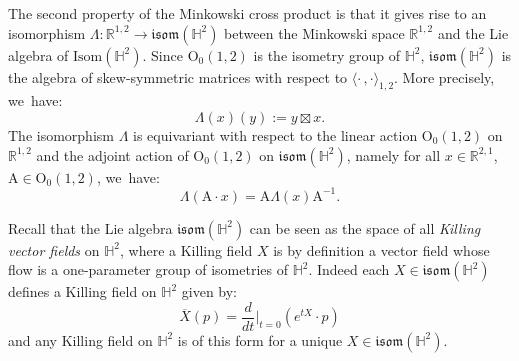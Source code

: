 \documentclass[10pt]{amsart}
\theoremstyle{plain}
\theoremstyle{definition}
\newcommand{\minko}{\mathbb{R}^{1,2}}
\newcommand{\inner}[1] {\langle #1 \rangle}
\begin{document}
The second property of the Minkowski cross product is that it gives rise to an isomorphism $\Lambda: \mathbb{R}^{1,2}\to \mathfrak{isom}(\mathbb{H}^2)$ between the Minkowski space $\minko$ and the Lie algebra of $\mathrm{Isom}(\mathbb{H}^2)$. Since $\mathrm{O}_0(1,2)$ is the isometry group of $\mathbb{H}^2$, $\mathfrak{isom}(\mathbb{H}^2)$ is the algebra of skew-symmetric matrices with respect to $\inner{\cdot\,,\cdot}_{1,2}$. More precisely, we~have:\vspace*{-3pt}
\begin{equation}\label{lievskilling}
\Lambda(x)(y):=y\boxtimes x.
\end{equation}
The isomorphism $\Lambda$ is equivariant with respect to the linear action $\mathrm{O}_0(1,2)$ on $\minko$ and the adjoint action of $\mathrm{O}_0(1,2)$ on $\mathfrak{isom}(\mathbb{H}^2)$, namely for all $x\in \mathbb{R}^{2,1}$, $\mathrm{A}\in\mathrm{O}_0(1,2)$, we~have:\vspace*{-3pt}
\begin{equation}\label{adequivariance}
\Lambda(\mathrm{A}\cdot x)=\mathrm{A}\Lambda(x)\mathrm{A}^{-1}.
\end{equation}

Recall that the Lie algebra $\mathfrak{isom}(\mathbb{H}^2)$ can be seen as the space of all \emph{Killing vector fields} on $\mathbb{H}^2$, where a Killing field $X$ is by definition a vector field whose flow is a one-parameter group of isometries of $\mathbb{H}^2$. Indeed each $X\in \mathfrak{isom}(\mathbb{H}^2)$ defines a Killing field on $\mathbb{H}^2$ given by:
\[
\overline{X}(p)=\frac{d}{dt}\Big\lvert_{t=0} (e^{tX}\cdot p)
\]
and any Killing field on $\mathbb{H}^2$ is of this form for a unique $X \in \mathfrak{isom}(\mathbb{H}^2)$.
\end{document}
